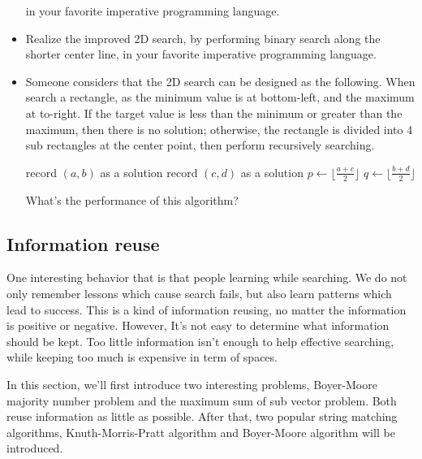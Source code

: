 \documentclass[UTF8]{article}
\begin{document}
\begin{Exercise}
\begin{itemize}
in your favorite imperative programming language.
\item Realize the improved 2D search, by performing binary search along the shorter center line, in your favorite
imperative programming language.
\item Someone considers that the 2D search can be designed as the following. When search a rectangle, as the
minimum value is at bottom-left, and the maximum at to-right. If the target value is less than the minimum or
greater than the maximum, then there is no solution; otherwise, the rectangle is divided into 4 sub rectangles
at the center point, then perform recursively searching.
\begin{algorithmic}[1]
 
      \State record $(a, b)$ as a solution
    \EndIf
      \State record $(c, d)$ as a solution
    \EndIf
    \State \Return
  \EndIf
  \State $p \gets \lfloor \frac{a + c}{2} \rfloor$
  \State $q \gets \lfloor \frac{b + d}{2} \rfloor$
  \State {}
  \State {}
  \State {}
  \State {}
\EndProcedure
\end{algorithmic}
What's the performance of this algorithm?
\end{itemize}
\end{Exercise}

\subsection{Information reuse}
One interesting behavior that is that people learning while searching. We do not only
remember lessons which cause search fails, but also learn patterns which lead to success. This is a
kind of information reusing, no matter the information is positive or negative. However, It's not easy
to determine what information should be kept. Too little information isn't
enough to help effective searching, while keeping too much is expensive in term of spaces.

In this section, we'll first introduce two interesting problems, Boyer-Moore majority number problem
and the maximum sum of sub vector problem. Both reuse information as little as possible. After that, two
popular string matching algorithms, Knuth-Morris-Pratt algorithm and Boyer-Moore algorithm will be
introduced.
\end{document}
